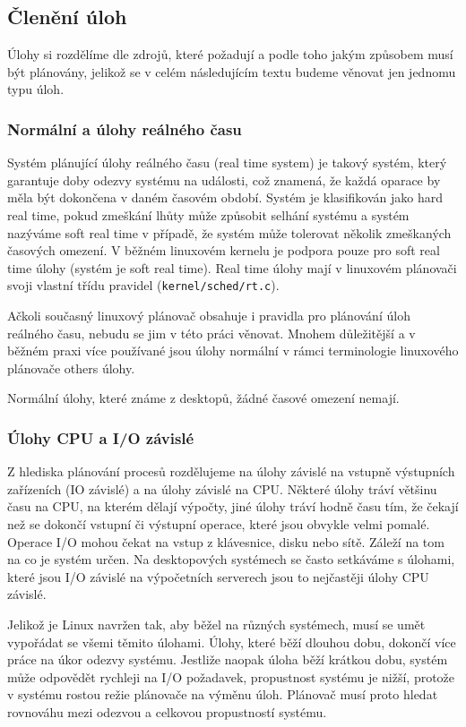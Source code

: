 \documentclass[a4paper,12pt]{article}
\begin{document}
\subsection{Členění úloh}
Úlohy si rozdělíme dle zdrojů, které požadují a podle toho jakým způsobem musí být plánovány, jelikož se v celém 
následujícím textu budeme věnovat jen jednomu typu úloh.

\subsubsection{Normální a úlohy reálného času}

Systém plánující úlohy reálného času (real time system) je takový systém, který garantuje doby odezvy systému na události, což znamená, že každá oparace by měla být dokončena v daném časovém období. Systém je klasifikován jako hard real time, pokud zmeškání lhůty může způsobit selhání systému a systém nazýváme soft real time v případě, že systém může tolerovat několik zmeškaných časových omezení. V běžném linuxovém kernelu je podpora pouze pro soft real time úlohy (systém je soft real time). Real time úlohy mají v linuxovém plánovači svoji vlastní třídu pravidel (\verb#kernel/sched/rt.c#).

Ačkoli současný linuxový plánovač obsahuje i pravidla pro plánování úloh reálného času, nebudu se jim v této práci věnovat. Mnohem důležitější a v běžném praxi více používané jsou úlohy normální v rámci terminologie linuxového plánovače others úlohy.

Normální úlohy, které známe z desktopů, žádné časové omezení nemají.

\subsubsection{Úlohy CPU a I/O závislé}

Z hlediska plánování procesů rozdělujeme na úlohy závislé na vstupně výstupních zařízeních (IO závislé) a na úlohy závislé na CPU. Některé úlohy tráví většinu času na CPU, na kterém dělají výpočty, jiné úlohy tráví hodně času tím, že čekají než se dokončí vstupní či výstupní operace, které jsou obvykle velmi pomalé. Operace I/O mohou čekat na vstup z klávesnice, disku nebo sítě. 
Záleží na tom na co je systém určen. Na desktopových systémech se často setkáváme s úlohami, které jsou I/O závislé na výpočetních serverech jsou to nejčastěji úlohy CPU závislé. 

Jelikož je Linux navržen tak, aby běžel na různých systémech, musí se umět vypořádat se všemi těmito úlohami. Úlohy, které běží dlouhou dobu, dokončí více práce na úkor odezvy systému. Jestliže naopak úloha běží krátkou dobu, systém může odpovědět rychleji na I/O požadavek, propustnost systému je nižší, protože v systému rostou režie plánovače na výměnu úloh. Plánovač musí proto hledat rovnováhu mezi odezvou a celkovou propustností systému. 
\end{document}
